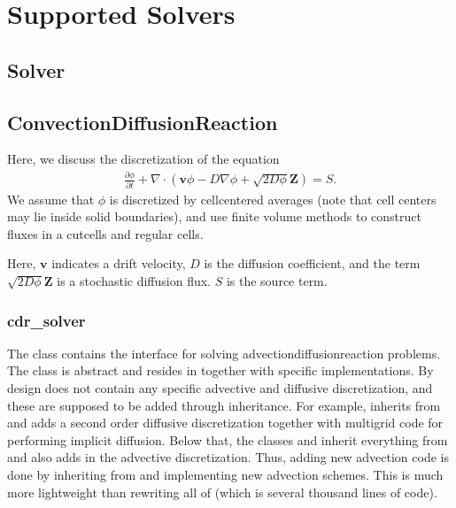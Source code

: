 \documentclass[letterpaper,10pt,english]{sphinxmanual}
\begin{document}
\chapter{Supported Solvers}
\label{\detokenize{index:supported-solvers}}\label{\detokenize{index:chap-supportedsolvers}}

\section{Solver}
\label{\detokenize{Solver:solver}}\label{\detokenize{Solver:chap-solver}}\label{\detokenize{Solver::doc}}

\section{Convection\sphinxhyphen{}Diffusion\sphinxhyphen{}Reaction}
\label{\detokenize{CDR:convection-diffusion-reaction}}\label{\detokenize{CDR:chap-cdr}}\label{\detokenize{CDR::doc}}
Here, we discuss the discretization of the equation
\begin{equation*}
\begin{split}\frac{\partial \phi}{\partial t} + \nabla\cdot\left(\mathbf{v} \phi - D\nabla \phi + \sqrt{2D\phi}\mathbf{Z}\right) = S.\end{split}
\end{equation*}
We assume that \(\phi\) is discretized by cell\sphinxhyphen{}centered averages (note that cell centers may lie inside solid boundaries), and use finite volume methods to construct fluxes in a cut\sphinxhyphen{}cells and regular cells.

Here, \(\mathbf{v}\) indicates a drift velocity, \(D\) is the diffusion coefficient, and the term \(\sqrt{2D\phi}\mathbf{Z}\) is a stochastic diffusion flux. \(S\) is the source term.


\subsection{cdr\_solver}
\label{\detokenize{CDR:cdr-solver}}\label{\detokenize{CDR:chap-cdr-solver}}
The  class contains the interface for solving advection\sphinxhyphen{}diffusion\sphinxhyphen{}reaction problems.
The class is abstract and resides in  together with specific implementations.
By design  does not contain any specific advective and diffusive discretization, and these are supposed to be added through inheritance.
For example,  inherits from  and adds a second order diffusive discretization together with multigrid code for performing implicit diffusion.
Below that, the classes  and  inherit everything from  and also adds in the advective discretization.
Thus, adding new advection code is done by inheriting from  and implementing new advection schemes.
This is much more lightweight than rewriting all of  (which is several thousand lines of code).
\end{document}
